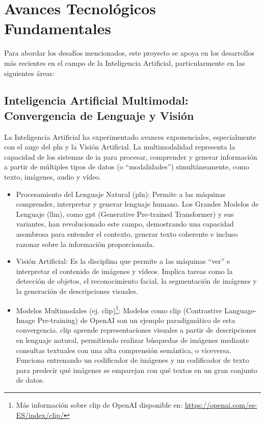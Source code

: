 \section{Avances Tecnológicos Fundamentales}
Para abordar los desafíos mencionados, este proyecto se apoya en los desarrollos más recientes en el campo de la Inteligencia Artificial, particularmente en las siguientes áreas:

\subsection{Inteligencia Artificial Multimodal: Convergencia de Lenguaje y Visión}
La Inteligencia Artificial ha experimentado avances exponenciales, especialmente con el auge del \gls{pln} y la Visión Artificial. La multimodalidad representa la capacidad de los sistemas de \gls{ia} para procesar, comprender y generar información a partir de múltiples tipos de datos (o ``modalidades'') simultáneamente, como texto, imágenes, audio y vídeo.
\begin{itemize}
    \item Procesamiento del Lenguaje Natural (\gls{pln}): Permite a las máquinas comprender, interpretar y generar lenguaje humano. Los Grandes Modelos de Lenguaje (\gls{llm}), como \gls{gpt} (Generative Pre-trained Transformer) y sus variantes, han revolucionado este campo, demostrando una capacidad asombrosa para entender el contexto, generar texto coherente e incluso razonar sobre la información proporcionada.
    \item Visión Artificial: Es la disciplina que permite a las máquinas ``ver'' e interpretar el contenido de imágenes y vídeos. Implica tareas como la detección de objetos, el reconocimiento facial, la segmentación de imágenes y la generación de descripciones visuales.
    \item Modelos Multimodales (ej. \gls{clip})\footnote{Más información sobre \gls{clip} de OpenAI disponible en: \url{https://openai.com/es-ES/index/clip/}}: Modelos como \gls{clip} (Contrastive Language-Image Pre-training) de OpenAI son un ejemplo paradigmático de esta convergencia. \gls{clip} aprende representaciones visuales a partir de descripciones en lenguaje natural, permitiendo realizar búsquedas de imágenes mediante consultas textuales con una alta comprensión semántica, o viceversa. Funciona entrenando un codificador de imágenes y un codificador de texto para predecir qué imágenes se emparejan con qué textos en un gran conjunto de datos.
\end{itemize}


